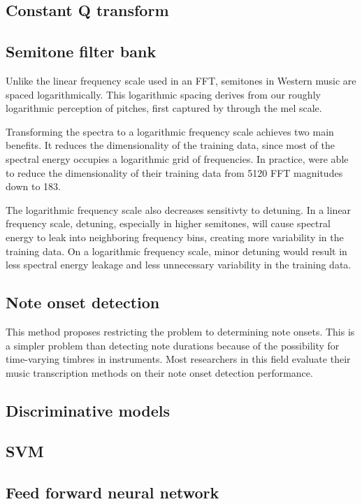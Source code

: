 \documentclass[5p]{elsarticle}
\begin{document}
\subsection{Constant Q transform}



\subsection{Semitone filter bank}
Unlike the linear frequency scale used in an FFT, semitones in Western music are spaced logarithmically. This logarithmic spacing derives from our roughly logarithmic perception of pitches, first captured by \citet{stevens1937scale} through the mel scale. 

Transforming the spectra to a logarithmic frequency scale achieves two main benefits. It reduces the dimensionality of the training data, since most of the spectral energy occupies a logarithmic grid of frequencies. In practice, \citet{bock2012polyphonic} were able to reduce the dimensionality of their training data from 5120 FFT magnitudes down to 183. 

The logarithmic frequency scale also decreases sensitivty to detuning. In a linear frequency scale, detuning, especially in higher semitones, will cause spectral energy to leak into neighboring frequency bins, creating more variability in the training data. On a logarithmic frequency scale, minor detuning would result in less spectral energy leakage and less unnecessary variability in the training data.

\subsection{Note onset detection}
This method proposes restricting the problem to determining note onsets. This is a simpler problem than detecting note durations because of the possibility for time-varying timbres in instruments. Most researchers in this field evaluate their music transcription methods on their note onset detection performance. 
\subsection{Discriminative models}
\subsection{SVM}

\subsection{Feed forward neural network}
\end{document}
